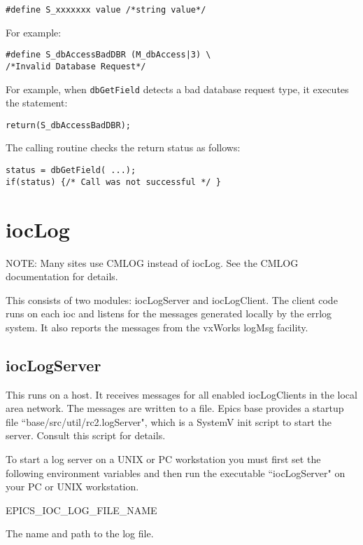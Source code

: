 \begin{verbatim}#define S_xxxxxxx value /*string value*/
\end{verbatim}For example:

\begin{verbatim}#define S_dbAccessBadDBR (M_dbAccess|3) \
/*Invalid Database Request*/
\end{verbatim}For example, when \verb|dbGetField| detects a bad database request type, it executes the statement:

\begin{verbatim}return(S_dbAccessBadDBR);
\end{verbatim}The calling routine checks the return status as follows:

\begin{verbatim}status = dbGetField( ...);
if(status) {/* Call was not successful */ }
\end{verbatim}\section{iocLog}

NOTE: Many sites use CMLOG instead of iocLog. See the CMLOG documentation for details.

This consists of two modules: iocLogServer and iocLogClient. The client code runs on each ioc and listens for the 
messages generated locally by the errlog system. It also reports the messages from the vxWorks logMsg facility.

\subsection{iocLogServer}

This runs on a host. It receives messages for all enabled iocLogClients in the local area network. The messages are written 
to a file. Epics base provides a startup file ``base/src/util/rc2.logServer", which is a SystemV init script to start the server. 
Consult this script for details.

To start a log server on a UNIX or PC workstation you must first set the following environment variables and then run the 
executable ``iocLogServer" on your PC or UNIX workstation. 

\begin{description}\item {}EPICS\_IOC\_LOG\_FILE\_NAME 

\end{description}The name and path to the log file.

